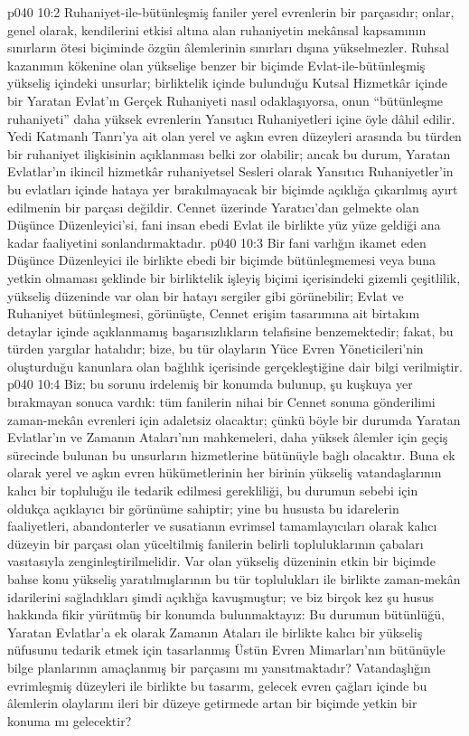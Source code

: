 \vs p040 10:2 Ruhaniyet\hyp{}ile\hyp{}bütünleşmiş faniler yerel evrenlerin bir parçasıdır; onlar, genel olarak, kendilerini etkisi altına alan ruhaniyetin mekânsal kapsamının sınırların ötesi biçiminde özgün âlemlerinin sınırları dışına yükselmezler. Ruhsal kazanımın kökenine olan yükselişe benzer bir biçimde Evlat\hyp{}ile\hyp{}bütünleşmiş yükseliş içindeki unsurlar; birliktelik içinde bulunduğu Kutsal Hizmetkâr içinde bir Yaratan Evlat’ın Gerçek Ruhaniyeti nasıl odaklaşıyorsa, onun “bütünleşme ruhaniyeti” daha yüksek evrenlerin Yansıtıcı Ruhaniyetleri içine öyle dâhil edilir. Yedi Katmanlı Tanrı’ya ait olan yerel ve aşkın evren düzeyleri arasında bu türden bir ruhaniyet ilişkisinin açıklanması belki zor olabilir; ancak bu durum, Yaratan Evlatlar’ın ikincil hizmetkâr ruhaniyetsel Sesleri olarak Yansıtıcı Ruhaniyetler’in bu evlatları içinde hataya yer bırakılmayacak bir biçimde açıklığa çıkarılmış ayırt edilmenin bir parçası değildir. Cennet üzerinde Yaratıcı’dan gelmekte olan Düşünce Düzenleyici’si, fani insan ebedi Evlat ile birlikte yüz yüze geldiği ana kadar faaliyetini sonlandırmaktadır.
\vs p040 10:3 Bir fani varlığın ikamet eden Düşünce Düzenleyici ile birlikte ebedi bir biçimde bütünleşmemesi veya buna yetkin olmaması şeklinde bir birliktelik işleyiş biçimi içerisindeki gizemli çeşitlilik, yükseliş düzeninde var olan bir hatayı sergiler gibi görünebilir; Evlat ve Ruhaniyet bütünleşmesi, görünüşte, Cennet erişim tasarımına ait birtakım detaylar içinde açıklanmamış başarısızlıkların telafisine benzemektedir; fakat, bu türden yargılar hatalıdır; bize, bu tür olayların Yüce Evren Yöneticileri’nin oluşturduğu kanunlara olan bağlılık içerisinde gerçekleştiğine dair bilgi verilmiştir.
\vs p040 10:4 Biz; bu sorunu irdelemiş bir konumda bulunup, şu kuşkuya yer bırakmayan sonuca vardık: tüm fanilerin nihai bir Cennet sonuna gönderilimi zaman\hyp{}mekân evrenleri için adaletsiz olacaktır; çünkü böyle bir durumda Yaratan Evlatlar’ın ve Zamanın Ataları’nın mahkemeleri, daha yüksek âlemler için geçiş sürecinde bulunan bu unsurların hizmetlerine bütünüyle bağlı olacaktır. Buna ek olarak yerel ve aşkın evren hükümetlerinin her birinin yükseliş vatandaşlarının kalıcı bir topluluğu ile tedarik edilmesi gerekliliği, bu durumun sebebi için oldukça açıklayıcı bir görünüme sahiptir; yine bu hususta bu idarelerin faaliyetleri, abandonterler ve susatianın evrimsel tamamlayıcıları olarak kalıcı düzeyin bir parçası olan yüceltilmiş fanilerin belirli topluluklarının çabaları vasıtasıyla zenginleştirilmelidir. Var olan yükseliş düzeninin etkin bir biçimde bahse konu yükseliş yaratılmışlarının bu tür toplulukları ile birlikte zaman\hyp{}mekân idarilerini sağladıkları şimdi açıklığa kavuşmuştur; ve biz birçok kez şu husus hakkında fikir yürütmüş bir konumda bulunmaktayız: Bu durumun bütünlüğü, Yaratan Evlatlar’a ek olarak Zamanın Ataları ile birlikte kalıcı bir yükseliş nüfusunu tedarik etmek için tasarlanmış Üstün Evren Mimarları’nın bütünüyle bilge planlarının amaçlanmış bir parçasını mı yansıtmaktadır? Vatandaşlığın evrimleşmiş düzeyleri ile birlikte bu tasarım, gelecek evren çağları içinde bu âlemlerin olaylarını ileri bir düzeye getirmede artan bir biçimde yetkin bir konuma mı gelecektir?
